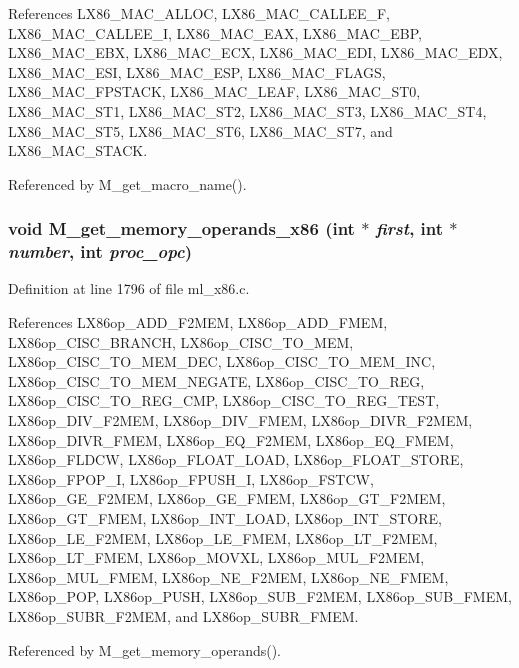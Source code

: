 References LX86\_\-MAC\_\-ALLOC, LX86\_\-MAC\_\-CALLEE\_\-F, LX86\_\-MAC\_\-CALLEE\_\-I, LX86\_\-MAC\_\-EAX, LX86\_\-MAC\_\-EBP, LX86\_\-MAC\_\-EBX, LX86\_\-MAC\_\-ECX, LX86\_\-MAC\_\-EDI, LX86\_\-MAC\_\-EDX, LX86\_\-MAC\_\-ESI, LX86\_\-MAC\_\-ESP, LX86\_\-MAC\_\-FLAGS, LX86\_\-MAC\_\-FPSTACK, LX86\_\-MAC\_\-LEAF, LX86\_\-MAC\_\-ST0, LX86\_\-MAC\_\-ST1, LX86\_\-MAC\_\-ST2, LX86\_\-MAC\_\-ST3, LX86\_\-MAC\_\-ST4, LX86\_\-MAC\_\-ST5, LX86\_\-MAC\_\-ST6, LX86\_\-MAC\_\-ST7, and LX86\_\-MAC\_\-STACK.

Referenced by M\_\-get\_\-macro\_\-name().
\subsubsection{\setlength{\rightskip}{0pt plus 5cm}void M\_\-get\_\-memory\_\-operands\_\-x86 (int $\ast$ {\em first}, int $\ast$ {\em number}, int {\em proc\_\-opc})}\label{ml__x86_8c_4e1b8aa32d43a1062c2ee16273f9f85e}




Definition at line 1796 of file ml\_\-x86.c.

References LX86op\_\-ADD\_\-F2MEM, LX86op\_\-ADD\_\-FMEM, LX86op\_\-CISC\_\-BRANCH, LX86op\_\-CISC\_\-TO\_\-MEM, LX86op\_\-CISC\_\-TO\_\-MEM\_\-DEC, LX86op\_\-CISC\_\-TO\_\-MEM\_\-INC, LX86op\_\-CISC\_\-TO\_\-MEM\_\-NEGATE, LX86op\_\-CISC\_\-TO\_\-REG, LX86op\_\-CISC\_\-TO\_\-REG\_\-CMP, LX86op\_\-CISC\_\-TO\_\-REG\_\-TEST, LX86op\_\-DIV\_\-F2MEM, LX86op\_\-DIV\_\-FMEM, LX86op\_\-DIVR\_\-F2MEM, LX86op\_\-DIVR\_\-FMEM, LX86op\_\-EQ\_\-F2MEM, LX86op\_\-EQ\_\-FMEM, LX86op\_\-FLDCW, LX86op\_\-FLOAT\_\-LOAD, LX86op\_\-FLOAT\_\-STORE, LX86op\_\-FPOP\_\-I, LX86op\_\-FPUSH\_\-I, LX86op\_\-FSTCW, LX86op\_\-GE\_\-F2MEM, LX86op\_\-GE\_\-FMEM, LX86op\_\-GT\_\-F2MEM, LX86op\_\-GT\_\-FMEM, LX86op\_\-INT\_\-LOAD, LX86op\_\-INT\_\-STORE, LX86op\_\-LE\_\-F2MEM, LX86op\_\-LE\_\-FMEM, LX86op\_\-LT\_\-F2MEM, LX86op\_\-LT\_\-FMEM, LX86op\_\-MOVXL, LX86op\_\-MUL\_\-F2MEM, LX86op\_\-MUL\_\-FMEM, LX86op\_\-NE\_\-F2MEM, LX86op\_\-NE\_\-FMEM, LX86op\_\-POP, LX86op\_\-PUSH, LX86op\_\-SUB\_\-F2MEM, LX86op\_\-SUB\_\-FMEM, LX86op\_\-SUBR\_\-F2MEM, and LX86op\_\-SUBR\_\-FMEM.

Referenced by M\_\-get\_\-memory\_\-operands().
